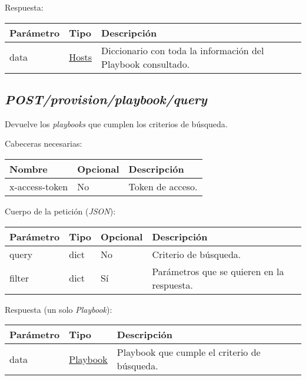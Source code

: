		Respuesta:
		\begin{table}[h!]
			\centering
	\begin{adjustbox}{max width=\textwidth}
			\begin{tabularx}{\linewidth}{|l|l|L|}
				\hline
				Parámetro & Tipo & Descripción \\ \hline
				data & \hyperref[sec:hosts]{Hosts} & Diccionario con toda la información del Playbook consultado. \\ \hline
			\end{tabularx}
\end{adjustbox}
		\end{table}
	
	
	
	\pagebreak
	\subsection{\textit{POST/provision/playbook/query}}
		Devuelve los \textit{playbooks} que cumplen los criterios de búsqueda.
		
		Cabeceras necesarias:
		\begin{table}[h!]
			\centering
	\begin{adjustbox}{max width=\textwidth}
			\begin{tabular}{|l|l|l|}
				\hline
				Nombre & Opcional & Descripción \\ \hline
				x-access-token & No & Token de acceso. \\ \hline
			\end{tabular}
\end{adjustbox}
		\end{table}
		
		Cuerpo de la petición (\textit{JSON}):
		\begin{table}[h!]
			\centering
	\begin{adjustbox}{max width=\textwidth}
			\begin{tabular}{|l|l|l|l|}
				\hline
				Parámetro & Tipo & Opcional & Descripción \\ \hline
				query & dict & No & Criterio de búsqueda. \\ \hline
				filter & dict & Sí & Parámetros que se quieren en la respuesta. \\ \hline
			\end{tabular}
\end{adjustbox}
		\end{table}
		
		
		Respuesta (un solo \textit{Playbook}):
		\begin{table}[h!]
			\centering
	\begin{adjustbox}{max width=\textwidth}
			\begin{tabular}{|l|l|l|}
				\hline
				Parámetro & Tipo & Descripción \\ \hline
				data & \hyperref[sec:playbook]{Playbook} & Playbook que cumple el criterio de búsqueda. \\ \hline
			\end{tabular}
\end{adjustbox}
		\end{table}
		

